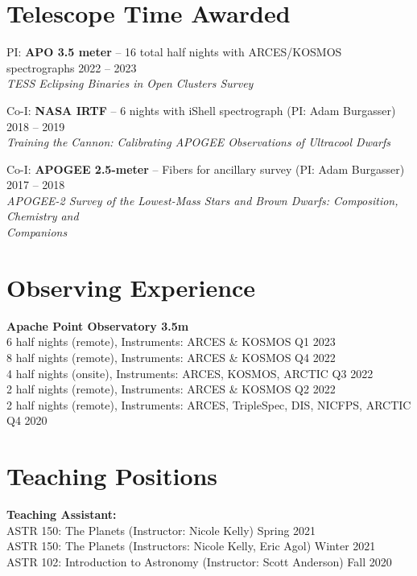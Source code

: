 \documentclass[margin,line]{resume}
\begin{document}
\begin{resume}

\section{\mysidestyle \textcolor{bcolor}{Telescope Time Awarded}}
PI: \textbf{APO 3.5 meter} -- 16 total half nights with ARCES/KOSMOS spectrographs \hfill 2022 -- 2023 \\ 
\textsl{TESS Eclipsing Binaries in Open Clusters Survey} 

Co-I: \textbf{NASA IRTF} -- 6 nights with iShell spectrograph (PI: Adam Burgasser) \hfill 2018 -- 2019 \\ 
\textsl{Training the Cannon: Calibrating APOGEE Observations of Ultracool Dwarfs} 

Co-I: \textbf{APOGEE 2.5-meter} -- Fibers for ancillary survey (PI: Adam Burgasser) \hfill 2017 -- 2018 \\
\textsl{APOGEE-2 Survey of the Lowest-Mass Stars and Brown Dwarfs: Composition, Chemistry and \\ Companions}

\newpage


\section{\mysidestyle \textcolor{bcolor}{Observing Experience}}
\textbf{Apache Point Observatory 3.5m}  \\
6 half nights (remote), Instruments: ARCES \& KOSMOS \hfill Q1 2023 \\
8 half nights (remote), Instruments: ARCES \& KOSMOS \hfill Q4 2022 \\
4 half nights (onsite), Instruments: ARCES, KOSMOS, ARCTIC \hfill Q3 2022 \\
2 half nights (remote), Instruments: ARCES \& KOSMOS \hfill Q2 2022 \\
2 half nights (remote), Instruments: ARCES, TripleSpec, DIS, NICFPS, ARCTIC \hfill Q4 2020


\section{\mysidestyle \textcolor{bcolor}{Teaching Positions}}
\textbf{Teaching Assistant:} \\
ASTR 150: The Planets (Instructor: Nicole Kelly) \hfill Spring 2021  \\
ASTR 150: The Planets (Instructors: Nicole Kelly, Eric Agol) \hfill Winter 2021  \\
ASTR 102: Introduction to Astronomy (Instructor: Scott Anderson) \hfill Fall 2020 


\end{resume}
\end{document}
